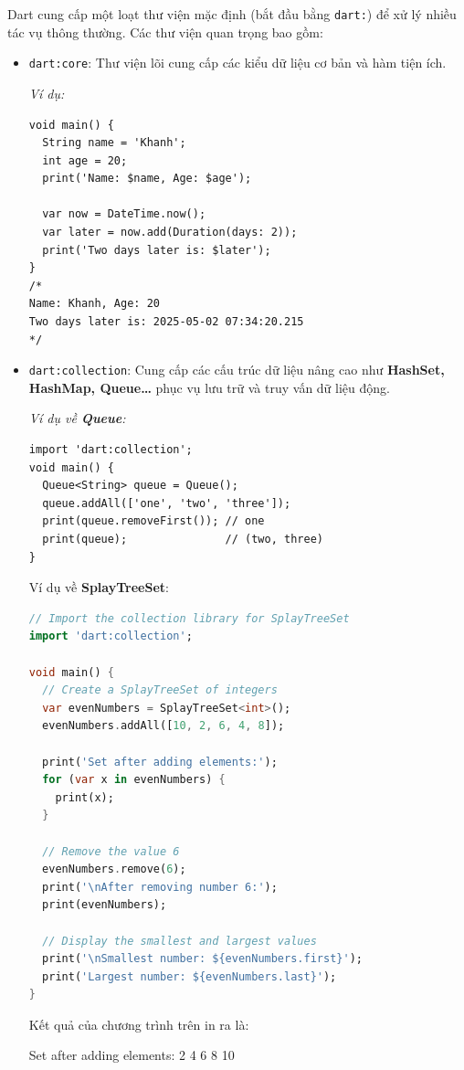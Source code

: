 \documentclass[../DoAn.tex]{subfiles}
\numberwithin{figure}{chapter}
\begin{document}
Dart cung cấp một loạt thư viện mặc định (bắt đầu bằng \texttt{dart:}) để xử lý nhiều tác vụ thông thường. Các thư viện quan trọng bao gồm:
\begin{itemize}
\item \texttt{dart:core}:  Thư viện lõi cung cấp các kiểu dữ liệu cơ bản và hàm tiện ích.

\textit{Ví dụ:}
\begin{lstlisting}
void main() {
  String name = 'Khanh';
  int age = 20;
  print('Name: $name, Age: $age');

  var now = DateTime.now();
  var later = now.add(Duration(days: 2));
  print('Two days later is: $later');
}
/*
Name: Khanh, Age: 20
Two days later is: 2025-05-02 07:34:20.215
*/
\end{lstlisting}

\item \texttt{dart:collection}: Cung cấp các cấu trúc dữ liệu nâng cao như \textbf{HashSet, HashMap, Queue…} phục vụ lưu trữ và truy vấn dữ liệu động.

\textit{Ví dụ về \textbf{Queue}:}

\begin{lstlisting}
import 'dart:collection';
void main() {
  Queue<String> queue = Queue();
  queue.addAll(['one', 'two', 'three']);
  print(queue.removeFirst()); // one
  print(queue);               // (two, three)
}
\end{lstlisting}

Ví dụ về \textbf{SplayTreeSet}:
\begin{lstlisting}[language=Dart]
// Import the collection library for SplayTreeSet
import 'dart:collection';

void main() {
  // Create a SplayTreeSet of integers
  var evenNumbers = SplayTreeSet<int>();
  evenNumbers.addAll([10, 2, 6, 4, 8]);

  print('Set after adding elements:');
  for (var x in evenNumbers) {
    print(x); 
  }

  // Remove the value 6
  evenNumbers.remove(6);
  print('\nAfter removing number 6:');
  print(evenNumbers);

  // Display the smallest and largest values
  print('\nSmallest number: ${evenNumbers.first}');
  print('Largest number: ${evenNumbers.last}');
}
\end{lstlisting}

Kết quả của chương trình trên in ra là:
\begin{myverbatim}
Set after adding elements:
2
4
6
8
10


\end{myverbatim}
\end{itemize}
\end{document}
